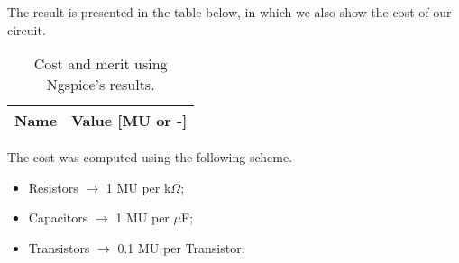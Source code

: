 The result is presented in the table below, in which we also show the cost of our circuit.

\begin{table}[h]
  \centering
  \begin{tabular}{|l|r|}
    \hline
    {\bf Name} & {\bf Value [MU or -]} \\ \hline
    
  \end{tabular}
  \caption{Cost and merit using Ngspice's results.}
  \label{tab:CostAndMerit}
\end{table}

The cost was computed using the following scheme.

\begin{itemize}
  \item Resistors $\rightarrow$ 1 MU per k$\Omega$;
  \item Capacitors $\rightarrow$ 1 MU per $\mu$F;
  \item Transistors $\rightarrow$ 0.1 MU per Transistor.
\end{itemize}



